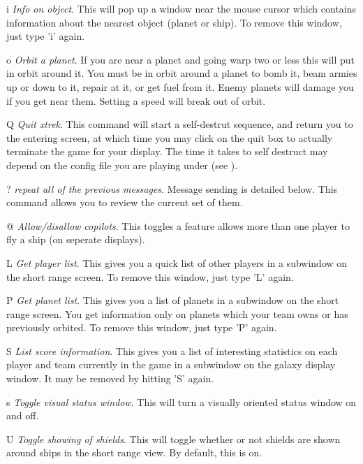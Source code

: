 \begin{list}{}{
	\renewcommand{\makelabel}[1]{{\tt #1 \hfill}}
         \setlength{\leftmargin}{.5in}
         \setlength{\labelwidth}{\leftmargin}
         \setlength{\labelsep}{0in}
}
\item[i]{\em Info on object}.
This will pop up a window near the mouse cursor which contains
information about the nearest object (planet or ship).
To remove this window, just type 'i' again.

\item[o]{\em Orbit a planet}.
If you are near a planet and going warp two or less this will put in
orbit around it.  You must be in orbit around a planet to bomb it, beam
armies up or down to it, repair at it, or get fuel from it.  Enemy
planets will damage you if you get near them.  Setting a speed will
break out of orbit.

\item[Q]{\em Quit xtrek}.
This command will start a self-destrut sequence, and return you to the
entering screen, at which time you may click on the quit box to actually
terminate the game for your display. The time it takes to self destruct may
depend on the config file you are playing under (see ).

\item[?]{\em repeat all of the previous messages}.
Message sending is detailed below.  This command allows you to
review the current set of them.

\item[@]{\em Allow/disallow copilots}.
This toggles a feature allows more than one player to fly a ship 
(on seperate displays).

\item[L]{\em Get player list}.
This gives you a quick list of other players in a subwindow on
the short range screen.
To remove this window, just type 'L' again.

\item[P]{\em Get planet list}.
This gives you a list of planets in a subwindow on the short range
screen.
You get information only on planets which your team
owns or has previously orbited.  To remove this window,
just type 'P' again.

\item[S]{\em List score information}.
This gives you a list of interesting statistics on each player and
team currently in the game in a subwindow on the galaxy display window. 
It may be removed by hitting 'S' again.

\item[s]{\em Toggle visual status window}.
This will turn a visually oriented status window on and off.

\item[U]{\em Toggle showing of shields}.
This will toggle whether or not shields are shown around ships in the
short range view. By default, this is on.


\end{list}
